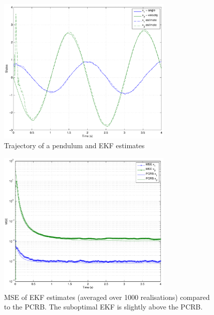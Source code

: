 \documentclass{article}
\begin{document}
\begin{figure}[H]
	\centering
	\includegraphics[width=0.75\textwidth]{../figures/pendulum_trajectory}
	\caption{Trajectory of a pendulum and EKF estimates}
\end{figure}
\begin{figure}[H]
	\centering
	\includegraphics[width=0.75\textwidth]{../figures/pendulum_pcrb}
	\caption{MSE of EKF estimates (averaged over 1000 realisations) compared to the PCRB. The suboptimal EKF is slightly above the PCRB.}
\end{figure}

\small


% 
\end{document}
